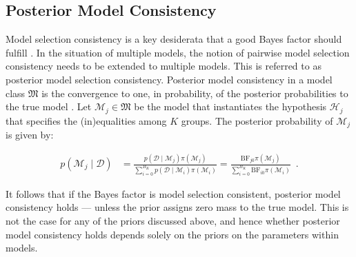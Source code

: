 \documentclass[11pt,a4paper]{article}
\theoremstyle{definition} %
\theoremstyle{case}
\newcommand{\prior}[1]{\pi\left({#1}\right)}
\newcommand{\bellnum}[1]{B_{#1}}
\newcommand{\rbellnum}[2]{B_{#1,\,#2}}
\newcommand{\numberthis}{\addtocounter{equation}{1}\tag{\theequation}}
\begin{document}

\subsection{Posterior Model Consistency}
Model selection consistency is a key desiderata that a good Bayes factor should fulfill \parencite[e.g.,][]{bayarri2012criteria, ly2016harold, consonni2018prior}. In the situation of multiple models, the notion of pairwise model selection consistency needs to be extended to multiple models. This is referred to as posterior model selection consistency. Posterior model consistency in a model class $\mathfrak{M}$ is the convergence to one, in probability, of the posterior probabilities to the true model \parencite[e.g.,][]{casella2009consistency, moreno2015posterior}. Let $\mathcal{M}_j \in \mathfrak{M}$ be the model that instantiates the hypothesis $\mathcal{H}_j$ that specifies the (in)equalities among $K$ groups. The posterior probability of $\mathcal{M}_j$ is given by:

\begin{align}
    p(\mathcal{M}_j \mid \mathcal{D}) &= \frac{p(\mathcal{D} \mid \mathcal{M}_j) \pi(\mathcal{M}_j)}{\sum_{i = 0}^{\bellnum{K}} p(\mathcal{D} \mid \mathcal{M}_i) \pi(\mathcal{M}_i)} 
    = \frac{\text{BF}_{j0}\pi(\mathcal{M}_j)}{\sum_{i = 0}^{\bellnum{K}} \text{BF}_{i0} \pi(\mathcal{M}_i)} \enspace .
\end{align}

It follows that if the Bayes factor is model selection consistent, posterior model consistency holds \parencite[see also][Theorem 1]{moreno2015posterior} --- unless the prior assigns zero mass to the true model. This is not the case for any of the priors discussed above, and hence whether posterior model consistency holds depends solely on the priors on the parameters within models.
\end{document}
